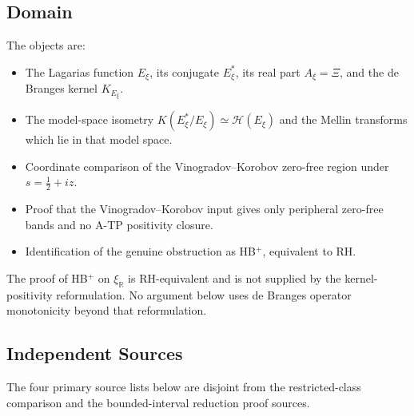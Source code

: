 \subsection{Domain}
\label{v4-arith:w7-c:domain}

The objects are:
\begin{itemize}
\item The Lagarias function \(E_{\xi}\), its conjugate
\(E_{\xi}^{*}\), its real part \(A_{\xi}=\Xi\), and the de Branges
kernel \(K_{E_{\xi}}\).
\item The model-space isometry \(K(E_{\xi}^{*}/E_{\xi})\simeq
\mathcal H(E_{\xi})\) and the Mellin transforms which lie in that
model space.
\item Coordinate comparison of the Vinogradov--Korobov zero-free region
under \(s=\tfrac12+iz\).
\item Proof that the Vinogradov--Korobov input gives only peripheral
zero-free bands and no A-TP positivity closure.
\item Identification of the genuine obstruction as HB\(^{+}\),
equivalent to RH.
\end{itemize}

The proof of HB\(^{+}\) on \(\xi_{\mathbb R}\) is RH-equivalent and is
not supplied by the kernel-positivity reformulation. No argument below
uses de Branges operator monotonicity beyond that reformulation.

\subsection{Independent Sources}
\label{v4-arith:w7-c:sources}

The four primary source lists below are disjoint from
the restricted-class comparison and the bounded-interval reduction proof sources.

